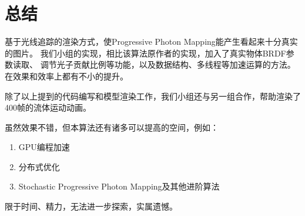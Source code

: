 \documentclass[a4paper,12pt]{article}
\theoremstyle{plain}
\numberwithin{thmdef}{section}
\begin{document}
\section{总结}
基于光线追踪的渲染方式，使Progressive Photon Mapping能产生看起来十分真实的图片。%
我们小组的实现，相比该算法原作者的实现，加入了真实物体BRDF参数读取、%
调节光子贡献比例等功能，以及数据结构、多线程等加速运算的方法。%
在效果和效率上都有不小的提升。\par
除了以上提到的代码编写和模型渲染工作，我们小组还与另一组合作，帮助渲染了400帧的流体运动动画。\par
虽然效果不错，但本算法还有诸多可以提高的空间，例如：
\begin{enumerate}
\small \setlength{\itemsep}{.1em}
\item GPU编程加速
\item 分布式优化
\item Stochastic Progressive Photon Mapping及其他进阶算法
\end{enumerate}\par
限于时间、精力，无法进一步探索，实属遗憾。

\end{document}
